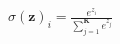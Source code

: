 \documentclass[]{standalone}
\begin{document}
$\sigma (\textbf{z})_i = \frac{e^{z_i}}{\sum_{j=1}^{\textbf{K}}e^{z_j}}$
\end{document}
